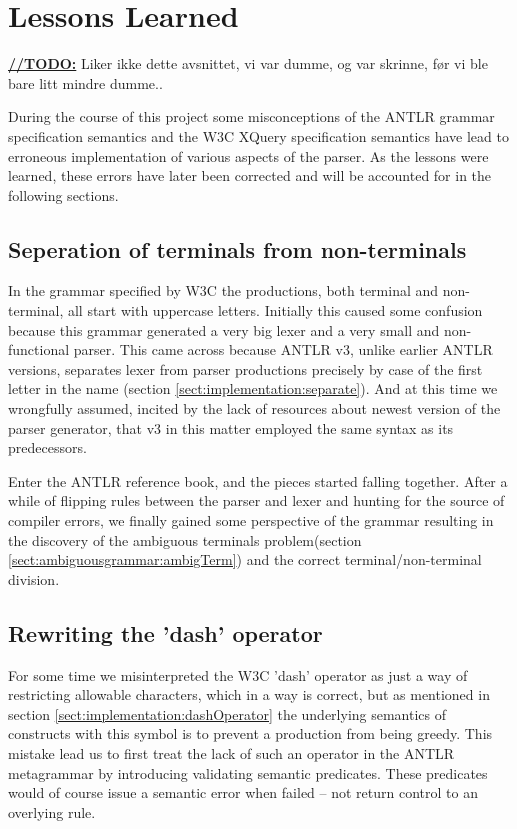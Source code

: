 \section{Lessons Learned}
\label{sect:discussion:deadEnds}
\underline{\textbf{\LARGE //TODO:}} Liker ikke dette avsnittet, vi var dumme, og var skrinne, f\o r vi ble bare litt mindre dumme..

During the course of this project some misconceptions of the ANTLR grammar specification semantics and the W3C XQuery specification semantics have lead to erroneous implementation of various aspects of the parser. As the lessons were learned, these errors have later been corrected and will be accounted for in the following sections.

\subsection{Seperation of terminals from non-terminals }

In the grammar specified by W3C the productions, both terminal and non-terminal, all start with uppercase letters. Initially this caused some confusion because this grammar generated a very big lexer and a very small and non-functional parser. This came across because ANTLR v3, unlike earlier ANTLR versions, separates lexer from parser productions precisely by case of the first letter in the name (section \ref{sect:implementation:separate}). And at this time we wrongfully assumed, incited by the lack of resources about newest version of the parser generator, that v3 in this matter employed the same syntax as its predecessors.

Enter the ANTLR reference book\cite{definitiveAntlr}, and the pieces started falling together. After a while of flipping rules between the parser and lexer and hunting for the source of compiler errors, we finally gained some perspective of the grammar resulting in the discovery of the ambiguous terminals problem(section \ref{sect:ambiguousgrammar:ambigTerm}) and the correct terminal/non-terminal division.

\subsection{Rewriting the 'dash' operator}

For some time we misinterpreted the W3C 'dash' operator as just a way of restricting allowable characters, which in a way is correct, but as mentioned in section \ref{sect:implementation:dashOperator} the underlying semantics of constructs with this symbol is to prevent a production from being greedy. This mistake lead us to first treat the lack of such an operator in the ANTLR metagrammar by introducing validating semantic predicates. These predicates would of course issue a semantic error when failed -- not return control to an overlying rule.

